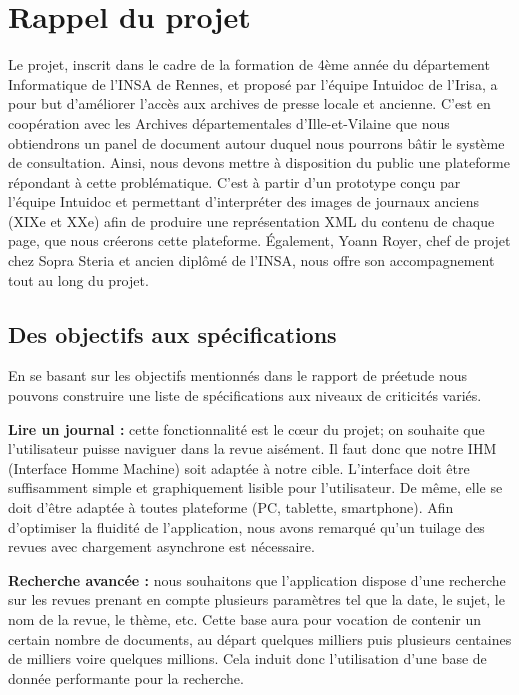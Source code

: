 \section{Rappel du projet}
\label{sec:rapp}

Le projet, inscrit dans le cadre de la formation de 4ème année du département Informatique de l’INSA de Rennes, et proposé par l’équipe
Intuidoc de l’Irisa, a pour but d’améliorer l’accès aux archives de presse locale et ancienne. C’est en coopération avec les Archives
départementales d’Ille-et-Vilaine que nous obtiendrons un panel de document autour duquel nous pourrons bâtir le système de consultation.
Ainsi, nous devons mettre à disposition du public une plateforme répondant à cette problématique.
C’est à partir d’un prototype conçu par l’équipe Intuidoc et permettant d’interpréter des images de journaux anciens (XIXe et XXe) afin
de produire une représentation XML du contenu de chaque page, que nous créerons cette plateforme.
Également, Yoann Royer, chef de projet chez Sopra Steria et ancien diplômé de l’INSA, nous offre son accompagnement tout au long du projet.

    \subsection{Des objectifs aux spécifications}
    \label{sec:objectifs}
    En se basant sur les objectifs mentionnés dans le rapport de préetude nous pouvons construire une liste de spécifications aux niveaux de criticités variés.


    \textbf{Lire un journal :} cette fonctionnalité est le cœur du projet; on souhaite que l’utilisateur puisse naviguer dans la revue aisément.
    Il faut donc que notre IHM (Interface Homme Machine) soit adaptée à notre cible. L’interface doit être suffisamment simple et graphiquement lisible pour l’utilisateur. De même, elle se doit d’être adaptée à toutes plateforme (PC, tablette, smartphone). Afin d’optimiser la fluidité de l’application, nous avons remarqué
    qu’un tuilage des revues avec chargement asynchrone est nécessaire.


    \textbf{Recherche avancée :} nous souhaitons que l’application dispose d’une recherche sur les revues prenant en compte plusieurs paramètres
    tel que la date, le sujet, le nom de la revue, le thème, etc. Cette base aura pour vocation de contenir un certain nombre de documents, au
    départ quelques milliers puis plusieurs centaines de milliers voire quelques millions. Cela induit donc l’utilisation d’une base de donnée
    performante pour la recherche.

